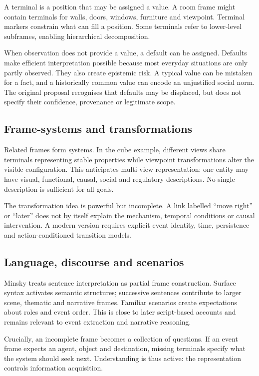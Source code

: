 \documentclass[11pt,a4paper]{article}
\begin{document}
A terminal is a position that may be assigned a value. A room frame might
contain terminals for walls, doors, windows, furniture and viewpoint. Terminal
markers constrain what can fill a position. Some terminals refer to lower-level
subframes, enabling hierarchical decomposition.

When observation does not provide a value, a default can be assigned. Defaults
make efficient interpretation possible because most everyday situations are
only partly observed. They also create epistemic risk. A typical value can be
mistaken for a fact, and a historically common value can encode an unjustified
social norm. The original proposal recognises that defaults may be displaced,
but does not specify their confidence, provenance or legitimate scope.

\subsection{Frame-systems and transformations}

Related frames form systems. In the cube example, different views share
terminals representing stable properties while viewpoint transformations alter
the visible configuration. This anticipates multi-view representation: one
entity may have visual, functional, causal, social and regulatory descriptions.
No single description is sufficient for all goals.

The transformation idea is powerful but incomplete. A link labelled
``move right'' or ``later'' does not by itself explain the mechanism, temporal
conditions or causal intervention. A modern version requires explicit event
identity, time, persistence and action-conditioned transition models.

\subsection{Language, discourse and scenarios}

Minsky treats sentence interpretation as partial frame construction. Surface
syntax activates semantic structures; successive sentences contribute to larger
scene, thematic and narrative frames. Familiar scenarios create expectations
about roles and event order. This is close to later script-based accounts
\citep{schank1977scripts} and remains relevant to event extraction and narrative
reasoning.

Crucially, an incomplete frame becomes a collection of questions. If an event
frame expects an agent, object and destination, missing terminals specify what
the system should seek next. Understanding is thus active: the representation
controls information acquisition.
\end{document}
